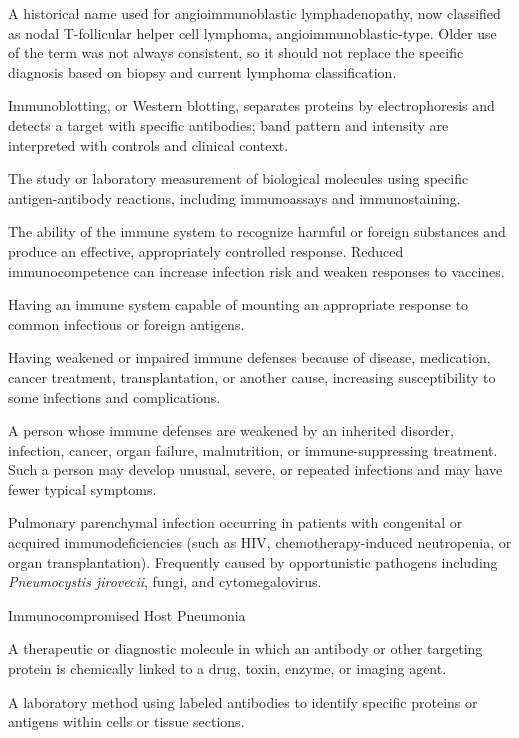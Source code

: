 A historical name used for angioimmunoblastic lymphadenopathy, now classified as nodal T-follicular helper cell lymphoma, angioimmunoblastic-type. Older use of the term was not always consistent, so it should not replace the specific diagnosis based on biopsy and current lymphoma classification.

 Immunoblotting, or Western blotting, separates proteins by electrophoresis and detects a target with specific antibodies; band pattern and intensity are interpreted with controls and clinical context.

 The study or laboratory measurement of biological molecules using specific antigen-antibody reactions, including immunoassays and immunostaining.

 The ability of the immune system to recognize harmful or foreign substances and produce an effective, appropriately controlled response. Reduced immunocompetence can increase infection risk and weaken responses to vaccines.

 Having an immune system capable of mounting an appropriate response to common infectious or foreign antigens.

 Having weakened or impaired immune defenses because of disease, medication, cancer treatment, transplantation, or another cause, increasing susceptibility to some infections and complications.

 A person whose immune defenses are weakened by an inherited disorder, infection, cancer, organ failure, malnutrition, or immune-suppressing treatment. Such a person may develop unusual, severe, or repeated infections and may have fewer typical symptoms.

 Pulmonary parenchymal infection occurring in patients with congenital or acquired immunodeficiencies (such as HIV, chemotherapy-induced neutropenia, or organ transplantation). Frequently caused by opportunistic pathogens including \textit{Pneumocystis jirovecii}, fungi, and cytomegalovirus.

\synonyms
Immunocompromised Host Pneumonia

 A therapeutic or diagnostic molecule in which an antibody or other targeting protein is chemically linked to a drug, toxin, enzyme, or imaging agent.

 A laboratory method using labeled antibodies to identify specific proteins or antigens within cells or tissue sections.

